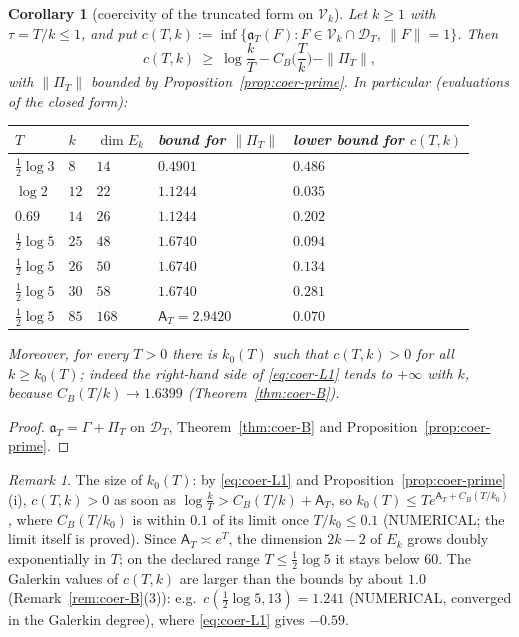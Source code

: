 \documentclass[11pt]{amsart}
\newtheorem{corollary}[theorem]{Corollary}
\theoremstyle{definition}
\theoremstyle{remark}
\newtheorem{remark}[theorem]{Remark}
\newcommand{\Aconst}{\mathsf A_T}
\newcommand{\PiT}{\Pi_T}
\begin{document}
\begin{corollary}[coercivity of the truncated form on $\mathcal V_k$]\label{cor:coer-L1}
Let $k\ge1$ with $\tau=T/k\le1$, and put $c(T,k):=\inf\{\mathfrak a_T(F):F\in\mathcal V_k\cap\mathcal D_T,\ \|F\|=1\}$. Then
\begin{equation}\label{eq:coer-L1}
c(T,k)\ \ge\ \log\frac kT-C_B\Big(\frac Tk\Big)-\|\PiT\| ,
\end{equation}
with $\|\PiT\|$ bounded by Proposition~\ref{prop:coer-prime}. In particular (evaluations of the closed form):
\begin{center}
\begin{tabular}{@{}lllll@{}}
\toprule
$T$ & $k$ & $\dim E_k$ & bound for $\|\PiT\|$ & lower bound for $c(T,k)$\\
\midrule
$\frac12\log3$ & $8$ & $14$ & $0.4901$ & $0.486$\\
$\log2$ & $12$ & $22$ & $1.1244$ & $0.035$\\
$0.69$ & $14$ & $26$ & $1.1244$ & $0.202$\\
$\frac12\log5$ & $25$ & $48$ & $1.6740$ & $0.094$\\
$\frac12\log5$ & $26$ & $50$ & $1.6740$ & $0.134$\\
$\frac12\log5$ & $30$ & $58$ & $1.6740$ & $0.281$\\
$\frac12\log5$ & $85$ & $168$ & $\Aconst=2.9420$ & $0.070$\\
\bottomrule
\end{tabular}
\end{center}
Moreover, for every $T>0$ there is $k_0(T)$ such that $c(T,k)>0$ for all $k\ge k_0(T)$; indeed the right-hand side
of \eqref{eq:coer-L1} tends to $+\infty$ with $k$, because $C_B(T/k)\to1.6399$ (Theorem~\ref{thm:coer-B}).
\end{corollary}
\begin{proof}
$\mathfrak a_T=\Gamma+\PiT$ on $\mathcal D_T$, Theorem~\ref{thm:coer-B} and Proposition~\ref{prop:coer-prime}.
\end{proof}

\begin{remark}\label{rem:coer-size}
The size of $k_0(T)$: by \eqref{eq:coer-L1} and Proposition~\ref{prop:coer-prime}(i), $c(T,k)>0$ as soon as
$\log\frac kT>C_B(T/k)+\Aconst$, so $k_0(T)\le Te^{\Aconst+C_B(T/k_0)}$, where $C_B(T/k_0)$ is within $0.1$ of
its limit once $T/k_0\le0.1$ (NUMERICAL; the limit itself is proved). Since $\Aconst\asymp e^T$, the dimension
$2k-2$ of $E_k$ grows doubly exponentially in $T$; on the declared range $T\le\frac12\log5$ it stays below $60$.
The Galerkin values of $c(T,k)$ are larger than the bounds by about $1.0$ (Remark~\ref{rem:coer-B}(3)):
e.g.\ $c(\frac12\log5,13)=1.241$ (NUMERICAL, converged in the Galerkin degree), where \eqref{eq:coer-L1} gives
$-0.59$.
\end{remark}
\end{document}
